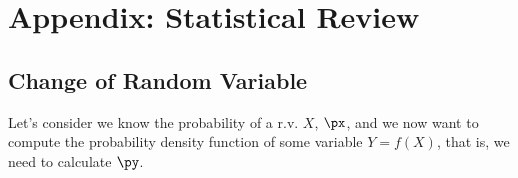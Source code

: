 %
%
%
\chapter{Appendix: Statistical Review}
\label{StatisticalReview} %



\section{Change of Random Variable}
\label{sec:1}
Let's consider we know the probability of a r.v. $X$, $\px$, and we now want to compute the probability density function of some variable $Y=f(X)$, that is, we need to calculate $\py$.

